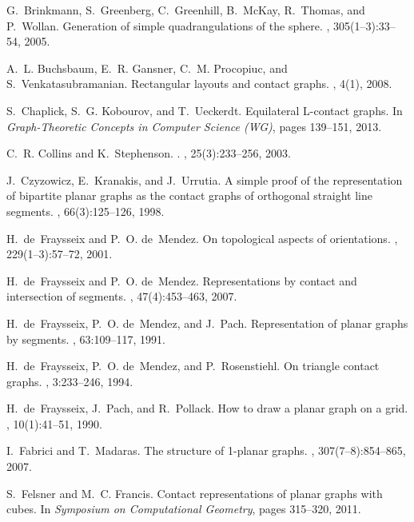 \documentclass{article}
\begin{document}
\begin{thebibliography}{10}
G.~Brinkmann, S.~Greenberg, C.~Greenhill, B.~McKay, R.~Thomas, and P.~Wollan.
\newblock Generation of simple quadrangulations of the sphere.
, 305(1--3):33--54, 2005.

A.~L. Buchsbaum, E.~R. Gansner, C.~M. Procopiuc, and S.~Venkatasubramanian.
\newblock Rectangular layouts and contact graphs.
, 4(1), 2008.

S.~Chaplick, S.~G. Kobourov, and T.~Ueckerdt.
\newblock Equilateral {L}-contact graphs.
\newblock In {\em Graph-Theoretic Concepts in Computer Science (WG)}, pages
  139--151, 2013.

C.~R. Collins and K.~Stephenson.
.
,
  25(3):233--256, 2003.

J.~Czyzowicz, E.~Kranakis, and J.~Urrutia.
\newblock A simple proof of the representation of bipartite planar graphs as
  the contact graphs of orthogonal straight line segments.
, 66(3):125--126, 1998.

H.~de~Fraysseix and P.~O. de~Mendez.
\newblock On topological aspects of orientations.
, 229(1--3):57--72, 2001.

H.~de~Fraysseix and P.~O. de~Mendez.
\newblock Representations by contact and intersection of segments.
, 47(4):453--463, 2007.

H.~de~Fraysseix, P.~O. de~Mendez, and J.~Pach.
\newblock Representation of planar graphs by segments.
, 63:109--117, 1991.

H.~de~Fraysseix, P.~O. de~Mendez, and P.~Rosenstiehl.
\newblock On triangle contact graphs.
, 3:233--246, 1994.

H.~de~Fraysseix, J.~Pach, and R.~Pollack.
\newblock How to draw a planar graph on a grid.
, 10(1):41--51, 1990.

I.~Fabrici and T.~Madaras.
\newblock The structure of 1-planar graphs.
, 307(7--8):854--865, 2007.

S.~Felsner and M.~C. Francis.
\newblock Contact representations of planar graphs with cubes.
\newblock In {\em Symposium on Computational Geometry}, pages 315--320, 2011.


\end{thebibliography}
\end{document}
